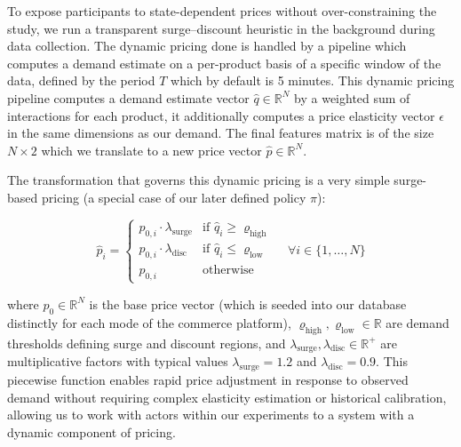 To expose participants to state-dependent prices without over-constraining the study, we run a transparent surge--discount heuristic in the background during data collection.
The dynamic pricing done is handled by a pipeline which computes a demand estimate on a per-product basis of a specific window of the data, defined by the period $T$ which by default is 5 minutes. This dynamic pricing pipeline computes a demand estimate vector $\hat{q} \in \mathbb{R}^N$ by a weighted sum of interactions for each product, it additionally computes a price elasticity vector $\hat{\epsilon}$ in the same dimensions as our demand. The final features matrix is of the size $N \times 2$ which we translate to a new price vector $\hat{p} \in \mathbb{R}^N$.


The transformation that governs this dynamic pricing is a very simple surge-based pricing (a special case of our later defined policy $\pi$):

\begin{equation}
\hat{p}_i = \begin{cases}
 p_{0,i} \cdot \lambda_{\text{surge}} & \text{if } \hat{q}_i \geq \varrho_{\text{high}} \\
 p_{0,i} \cdot \lambda_{\text{disc}} & \text{if } \hat{q}_i \leq \varrho_{\text{low}} \\
 p_{0,i} & \text{otherwise}
\end{cases}
\quad \forall i \in \{1, \ldots, N\}
\end{equation}

where $p_0 \in \mathbb{R}^N$ is the base price vector (which is seeded into our database distinctly for each mode of the commerce platform), $\varrho_{\text{high}}, \varrho_{\text{low}} \in \mathbb{R}$ are demand thresholds defining surge and discount regions, and $\lambda_{\text{surge}}, \lambda_{\text{disc}} \in \mathbb{R}^+$ are multiplicative factors with typical values $\lambda_{\text{surge}} = 1.2$ and $\lambda_{\text{disc}} = 0.9$. This piecewise function enables rapid price adjustment in response to observed demand without requiring complex elasticity estimation or historical calibration, allowing us to work with actors within our experiments to a system with a dynamic component of pricing.

%
%


